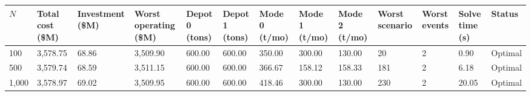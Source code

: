 \begin{tabular}{lllllllllllll}
\toprule
$N$ & Total cost (\$M) & Investment (\$M) & Worst operating (\$M) & Depot 0 (tons) & Depot 1 (tons) & Mode 0 (t/mo) & Mode 1 (t/mo) & Mode 2 (t/mo) & Worst scenario & Worst events & Solve time (s) & Status \\
\midrule
100 & 3,578.75 & 68.86 & 3,509.90 & 600.00 & 600.00 & 350.00 & 300.00 & 130.00 & 20 & 2 & 0.90 & Optimal \\
500 & 3,579.74 & 68.59 & 3,511.15 & 600.00 & 600.00 & 366.67 & 158.12 & 158.33 & 181 & 2 & 6.18 & Optimal \\
1,000 & 3,578.97 & 69.02 & 3,509.95 & 600.00 & 600.00 & 418.46 & 300.00 & 130.00 & 230 & 2 & 20.05 & Optimal \\
\bottomrule
\end{tabular}
